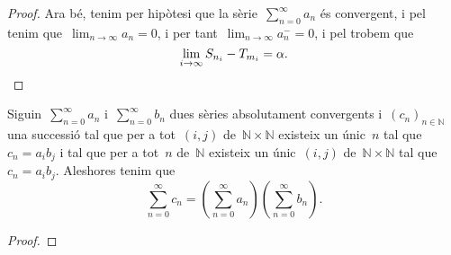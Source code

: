 \documentclass[../../main.tex]{subfiles}
\begin{document}
\begin{theorem}
\begin{proof}
            Ara bé, tenim per hipòtesi que la sèrie~\(\sum_{n=0}^{\infty}a_{n}\) és convergent, i pel \corollari{}  tenim que~\(\lim_{n\to\infty}a_{n}=0\), i per tant~\(\lim_{n\to\infty}a^{-}_{n}=0\), i pel  trobem que
            \[
                \lim_{i\to\infty}S_{n_{i}}-T_{m_{i}}=\alpha.\qedhere
            \]
        \end{proof}
    \end{theorem}
    \begin{theorem}
        \label{Teorema de Cauchy}\label{thm:Teorema de Cauchy}
        Siguin~\(\sum_{n=0}^{\infty}a_{n}\) i~\(\sum_{n=0}^{\infty}b_{n}\) dues sèries absolutament convergents i~\((c_{n})_{n\in\mathbb{N}}\) una successió tal que per a tot~\((i,j)\) de~\(\mathbb{N}\times\mathbb{N}\) existeix un únic~\(n\) tal que~\(c_{n}=a_{i}b_{j}\) i tal que per a tot~\(n\) de~\(\mathbb{N}\) existeix un únic~\((i,j)\) de~\(\mathbb{N}\times\mathbb{N}\) tal que~\(c_{n}=a_{i}b_{j}\).
        Aleshores tenim que
        \[
            \sum_{n=0}^{\infty}c_{n}=\left(\sum_{n=0}^{\infty}a_{n}\right)\left(\sum_{n=0}^{\infty}b_{n}\right).
        \]
        \begin{proof} %
        \begin{comment}
            Per la proposició \myref{prop:una sèrie absolutament convergent és convergent} tenim que les sèries~\(\sum_{n=0}^{\infty}a_{n}\) i~\(\sum_{n=0}^{\infty}b_{n}\) són convergents, i per tant tenim que la successió
            \[
                p_{N}=\left(\sum_{n=0}^{N}a_{n}\right)\left(\sum_{n=0}^{N}b_{n}\right)
            \]
            és convergent.

            Com que per hipòtesi les sèries~\(\sum_{n=0}^{\infty}a_{n}\) i~\(\sum_{n=0}^{\infty}b_{n}\) són absolutament convergents, per la definició de \myref{def:convergència absoluta d'una sèrie}, trobem que les sèries~\(\sum_{n=0}^{\infty}\abs{a_{n}}\) i~\(\sum_{n=0}^{\infty}\abs{b_{n}}\) són convergents, i per tant tenim que la successió
            \[
                p_{N}=\sum_{n=0}^{N}\abs{a_{n}}\sum_{n=0}^{N}\abs{b_{n}}
            \]
            és convergent.

            Per la definició de \myref{def:límit} trobem que per a tot~\(\varepsilon>0\) existeix un natural~\(n_{0}\) tal que per a tot~\(N\geq n_{0}\) es satisfà
            \begin{equation}
                \label{thm:Teorema de Cauchy:eq1}
                \abs{\sum_{n=0}^{N}\abs{a_{n}}\sum_{n=0}^{N}\abs{b_{n}}-\sum_{n=0}^{\infty}\abs{a_{n}}\sum_{n=0}^{\infty}\abs{b_{n}}}\leq\frac{\varepsilon}{2},
            \end{equation}
            i per \eqref{thm:Teorema de Cauchy:eq1} tenim que per a tot~\(N\geq n_{0}\) es satisfà
            \begin{equation}
                \label{thm:Teorema de Cauchy:eq3}
                \sum_{n=N}^{\infty}\abs{a_{n}}\sum_{n=N}^{\infty}\abs{b_{n}}\leq\frac{\varepsilon}{2}.
            \end{equation}




\end{comment}
\end{proof}
\end{theorem}
\end{document}
